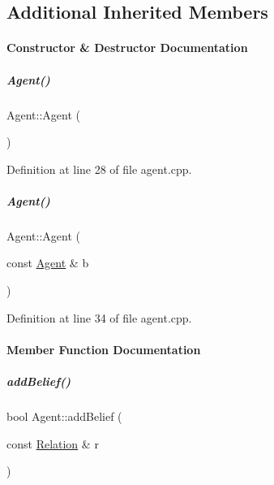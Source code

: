 \subsection*{Additional Inherited Members}


\paragraph{Constructor \& Destructor Documentation}
\mbox{\label{group__icubclient__representations_a24a60f1d260bf19a4f7f8a5f36881d3f}} 
\subparagraph{\texorpdfstring{Agent()}{Agent()}\hspace{0.1cm}{\footnotesize\ttfamily [1/2]}}
{\footnotesize\ttfamily Agent\+::\+Agent (\begin{DoxyParamCaption}{ }\end{DoxyParamCaption})}



Definition at line 28 of file agent.\+cpp.

\mbox{\label{group__icubclient__representations_a82c1a30e19f6f37eb994e258c98dce13}} 
\subparagraph{\texorpdfstring{Agent()}{Agent()}\hspace{0.1cm}{\footnotesize\ttfamily [2/2]}}
{\footnotesize\ttfamily Agent\+::\+Agent (\begin{DoxyParamCaption}\item[{const \hyperlink{group__icubclient__representations_classicubclient_1_1Agent}{Agent} \&}]{b }\end{DoxyParamCaption})}



Definition at line 34 of file agent.\+cpp.



\paragraph{Member Function Documentation}
\mbox{\label{group__icubclient__representations_a93a948b0365677e594244a75521f2b6a}} 
\subparagraph{\texorpdfstring{add\+Belief()}{addBelief()}}
{\footnotesize\ttfamily bool Agent\+::add\+Belief (\begin{DoxyParamCaption}\item[{const \hyperlink{group__icubclient__representations_classicubclient_1_1Relation}{Relation} \&}]{r }\end{DoxyParamCaption})}



